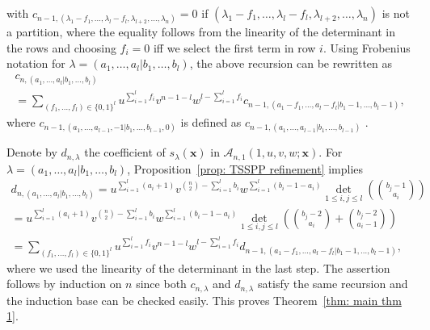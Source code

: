 \documentclass[11pt]{article}
\theoremstyle{definition}
\numberwithin{equation}{section}
\newcommand{\x}{\mathbf{x}}
\newcommand{\A}{\mathcal{A}}
\newcounter{x}
\newcounter{y}
\begin{document}
with $c_{n-1,(\lambda_1 -f_1,\ldots,\lambda_l-f_l,\lambda_{l+2},\ldots,\lambda_n)}=0$ if $(\lambda_1 -f_1,\ldots,\lambda_l-f_l,\lambda_{l+2},\ldots,\lambda_n)$ is not a partition, where the equality follows from the linearity of the determinant in the rows and choosing $f_i=0$ iff we select the first term in row $i$.
Using Frobenius notation for $\lambda=(a_1,\ldots,a_l|b_1,\ldots,b_l)$, the above recursion can be rewritten as
\begin{multline*}
c_{n,(a_1,\ldots,a_l|b_1,\ldots,b_l)} \\
= \sum_{(f_1,\ldots,f_l) \in \{0,1\}^l} u ^{\sum_{i=1}^l f_i} v^{n-1-l} w^{l-\sum_{i=1}^l f_i}  c_{n-1,(a_1-f_1,\ldots,a_l-f_l|b_1-1,\ldots,b_l-1)},
\end{multline*}
where $c_{n-1,(a_1,\ldots,a_{l-1},-1|b_1,\ldots,b_{l-1},0)}$ is defined as $c_{n-1,(a_1,\ldots,a_{l-1}|b_1,\ldots,b_{l-1})}$ .

Denote by $d_{n,\lambda}$ the coefficient of $s_\lambda(\x)$ in $\A_{n,1}(1, u,v,w;\x)$. For $\lambda=(a_1,\ldots,a_l| \allowbreak b_1,\ldots,b_l)$, Proposition~\ref{prop: TSSPP refinement} implies 
\begin{multline*}
d_{n,(a_1,\ldots,a_l|b_1,\ldots,b_l)} 
= u^{\sum_{i=1}^l (a_i+1)} v^{\binom{n}{2}-\sum_{i=1}^l b_i} w^{\sum_{i=1}^l(b_i-1-a_i)} 
 \det_{1 \leq i,j \leq l} \left( \binom{b_j-1}{a_i} \right)\\
= u^{\sum_{i=1}^l (a_i+1)} v^{\binom{n}{2}-\sum_{i=1}^l b_i} w^{\sum_{i=1}^l(b_i-1-a_i)} 
 \det_{1 \leq i,j \leq l} \left( \binom{b_j-2}{a_i}+\binom{b_j-2}{a_i-1} \right)\\
 =  \sum_{(f_1,\ldots,f_l) \in \{0,1\}^l}  u^{\sum_{i=1}^l f_i} v^{n-1-l} w^{l-\sum_{i=1}^l f_i} 
 d_{n-1,(a_1-f_1,\ldots,a_l-f_l|b_1-1,\ldots,b_l-1)},
\end{multline*}
where we used the linearity of the determinant in the last step. The assertion follows by induction on $n$ since both $c_{n,\lambda}$ and $d_{n,\lambda}$ satisfy the same recursion and the induction base can be checked easily. This proves Theorem~\ref{thm: main thm 1}.
\end{document}
